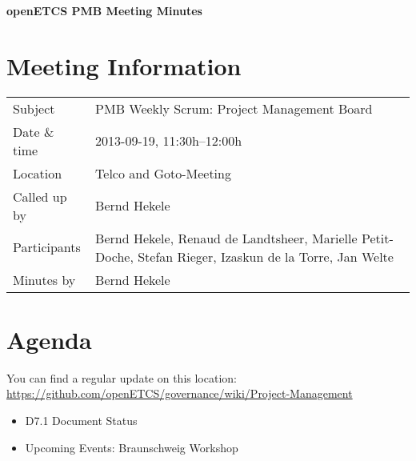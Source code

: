 \documentclass[a4paper, 11pt]{article}
\begin{document}
{\begin{center}\huge\bf openETCS PMB Meeting Minutes\end{center}}
\section{Meeting Information}

\renewcommand{\arraystretch}{1.5}
\begin{supertabular}{m{.2\textwidth}m{.8\textwidth}}
Subject & PMB Weekly Scrum: Project Management Board\\
Date \& time & 2013-09-19, 11:30h--12:00h\\
Location & Telco and Goto-Meeting\\
Called up by & Bernd Hekele\\
Participants &
Bernd Hekele,
Renaud de Landtsheer,
Marielle Petit-Doche,
Stefan Rieger,
Izaskun de la Torre,
Jan Welte
\\

Minutes by & Bernd Hekele\\

\end{supertabular}
\renewcommand{\arraystretch}{1.0}


\section{{Agenda}}
You can find a regular update on this location: \url{https://github.com/openETCS/governance/wiki/Project-Management}

\begin{itemize}
\item D7.1 Document Status
\item Upcoming Events: Braunschweig Workshop
\end{itemize}
\end{document}
